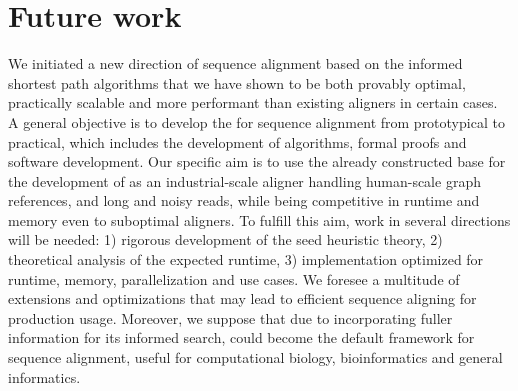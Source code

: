 \section*{Future work}

We initiated a new direction of sequence alignment based on the informed
shortest path algorithms \A that we have shown to be both provably optimal,
practically scalable and more performant than existing aligners in certain
cases. A general objective is to develop the \A for sequence alignment from
prototypical to practical, which includes the development of algorithms, formal
proofs and software development. Our specific aim is to use the already
constructed base for the development of \astarix as an industrial-scale aligner
handling human-scale graph references, and long and noisy reads, while being
competitive in runtime and memory even to suboptimal aligners. To fulfill this
aim, work in several directions will be needed: 1) rigorous development of the
seed heuristic theory, 2) theoretical analysis of the expected runtime, 3)
implementation optimized for runtime, memory, parallelization and use cases. We
foresee a multitude of extensions and optimizations that may lead to efficient
sequence aligning for production usage. Moreover, we suppose that due to
incorporating fuller information for its informed search, \A could become the
default framework for sequence alignment, useful for computational biology,
bioinformatics and general informatics.

